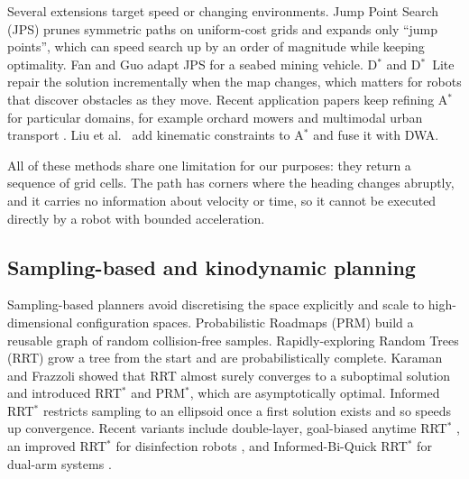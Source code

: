 \documentclass[11pt,a4paper]{article}
\begin{document}
Several extensions target speed or changing environments. Jump Point Search
(JPS) \citep{harabor2011online} prunes symmetric paths on uniform-cost grids
and expands only ``jump points'', which can speed search up by an order of
magnitude while keeping optimality. Fan and Guo \citep{fan2023improved}
adapt JPS for a seabed mining vehicle. D$^\ast$ \citep{stentz1994optimal} and
D$^\ast$~Lite \citep{koenig2002dstar} repair the solution incrementally when
the map changes, which matters for robots that discover obstacles as they
move. Recent application papers keep refining A$^\ast$ for particular
domains, for example orchard mowers \citep{zhang2024orchard} and multimodal
urban transport \citep{feng2023improved}. Liu et al.\ \citep{liu2023kinematically}
add kinematic constraints to A$^\ast$ and fuse it with DWA.

All of these methods share one limitation for our purposes: they return a
sequence of grid cells. The path has corners where the heading changes
abruptly, and it carries no information about velocity or time, so it cannot
be executed directly by a robot with bounded acceleration.

\subsection{Sampling-based and kinodynamic planning}
\label{sec:lit-sampling}

Sampling-based planners avoid discretising the space explicitly and scale to
high-dimensional configuration spaces. Probabilistic Roadmaps (PRM)
\citep{kavraki1996probabilistic} build a reusable graph of random collision-free
samples. Rapidly-exploring Random Trees (RRT) \citep{lavalle1998rapidly}
grow a tree from the start and are probabilistically complete.
Karaman and Frazzoli \citep{karaman2011sampling} showed that RRT almost
surely converges to a suboptimal solution and introduced RRT$^\ast$ and
PRM$^\ast$, which are asymptotically optimal. Informed RRT$^\ast$
\citep{gammell2014informed} restricts sampling to an ellipsoid once a first
solution exists and so speeds up convergence. Recent variants include
double-layer, goal-biased anytime RRT$^\ast$ \citep{esmaiel2024double}, an
improved RRT$^\ast$ for disinfection robots \citep{wang2024improved}, and
Informed-Bi-Quick RRT$^\ast$ for dual-arm systems \citep{zhang2024informed}.
\end{document}
